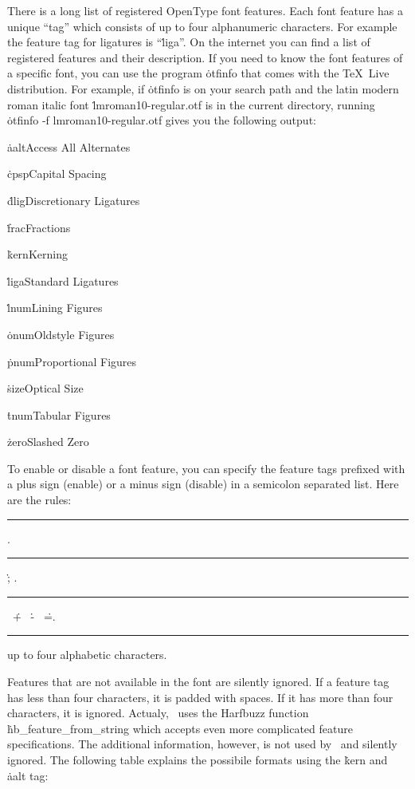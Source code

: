There is a long list of registered OpenType font features. Each font
feature has a unique ``tag'' which consists of up to four
alphanumeric characters.  For example the feature tag for ligatures is
``\.{liga}''. On the internet you can find a list of registered features
and their description.  If you need to know the font features of a
specific font, you can use the program \.{otfinfo} that comes with
the \TeX\ Live distribution. For example, if \.{otfinfo} is on your
search path and the latin modern roman italic font \.{lmroman10-regular.otf}
is in the current directory, running \.{otfinfo -f lmroman10-regular.otf}
gives you the following output:
\medskip
{\parskip 0pt
\.{aalt\qquad	Access All Alternates}\par
\.{cpsp\qquad	Capital Spacing}\par
\.{dlig\qquad	Discretionary Ligatures}\par
\.{frac\qquad	Fractions}\par
\.{kern\qquad	Kerning}\par
\.{liga\qquad	Standard Ligatures}\par
\.{lnum\qquad	Lining Figures}\par
\.{onum\qquad	Oldstyle Figures}\par
\.{pnum\qquad	Proportional Figures}\par
\.{size\qquad	Optical Size}\par
\.{tnum\qquad	Tabular Figures}\par
\.{zero\qquad	Slashed Zero}\par
}
\medskip

To enable or disable a font feature, you can specify the feature tags
prefixed with a plus sign (enable) or a minus sign (disable) in a semicolon
separated list. Here are the rules:
\medskip
\rule{}: .
\rule{}:  \.{;} .
\rule{}: \OR\ \.{+}
                    \OR\ \.{-} \OR\ \.{=}.
\rule{}: up to four alphabetic characters.
\medskip

Features that are not available in the font are silently ignored.
If a feature tag has less than four characters, it is padded with spaces.
If it has more than four characters, it is ignored.
Actualy, \HiTeX\ uses the Harfbuzz function \.{hb\_feature\_from\_string} which accepts
even more complicated feature specifications. %
The additional information, however, is not used by \HiTeX\ and silently ignored.
The following table explains the possibile formats using the \.{kern} and \.{aalt} tag:

